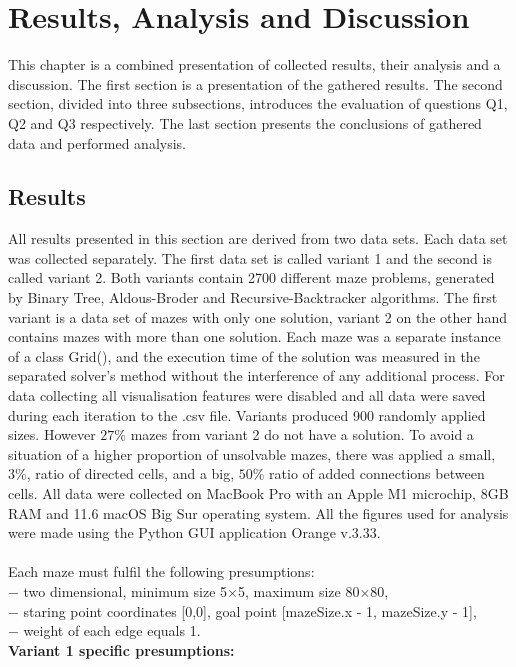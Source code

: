 \chapter{Results, Analysis and Discussion}\label{cha:Results Analysis and Discussion}
This chapter is a combined presentation of collected results, their analysis and a discussion. The first section is a presentation of the gathered results. 
The second section, divided into three subsections, introduces the evaluation of questions Q1, Q2 and Q3 respectively. The last section presents the 
conclusions of gathered data and performed analysis. 
\section{Results}
All results presented in this section are derived from two data sets. Each data set was collected separately. The first data set is called variant 1 and the second is 
called variant 2. Both variants contain 2700 different maze problems, generated by Binary Tree, Aldous-Broder and Recursive-Backtracker
algorithms. The first variant is a data set of mazes with only one solution, variant 2 on the other hand contains mazes with more than one solution.
Each maze was a separate instance of a class Grid(), and the execution time of the solution was measured in the separated solver's method without the interference of
any additional process. For data collecting all visualisation features were disabled and all data were saved during each iteration to the .csv file.
Variants produced  900 randomly applied sizes. However $27\%$ mazes from variant 2 do not have a solution. To avoid a situation of a higher 
proportion of unsolvable mazes, there was applied a small, $3\%$, ratio of directed cells, and a big, $50\%$ ratio of added connections between cells.
All data were collected on
MacBook Pro with an Apple M1 microchip, 8GB RAM and 11.6 macOS Big Sur operating system. All the figures used for analysis were made using the Python GUI application Orange v.3.33.\\
\\
Each maze must fulfil the following presumptions:\\
$-$ two dimensional, minimum size 5$\times$5, maximum size 80$\times$80,\\
$-$ staring point coordinates [0,0], goal point [mazeSize.x - 1, mazeSize.y - 1],\\
$-$ weight of each edge equals 1.\\
\textbf{Variant 1 specific presumptions: }\\
